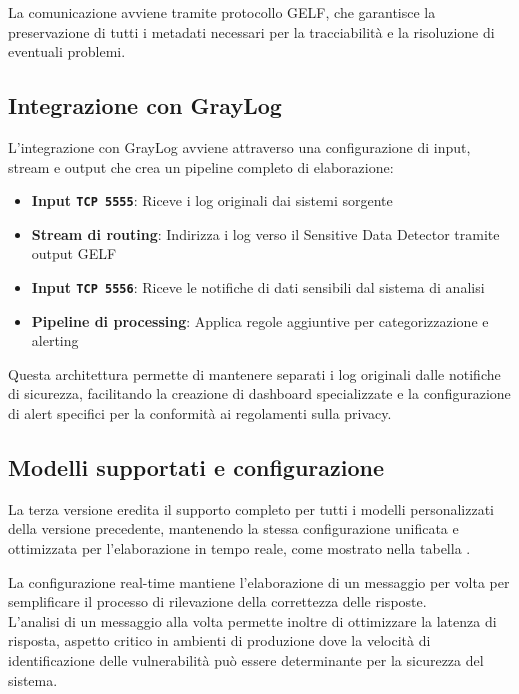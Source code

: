 \documentclass[12pt]{report}
\begin{document}
La comunicazione avviene tramite protocollo GELF, che garantisce la preservazione di tutti i metadati necessari per la tracciabilità e la risoluzione di eventuali problemi.


\subsection{Integrazione con GrayLog}
\label{subsec:ver3_integrazione}

L'integrazione con GrayLog avviene attraverso una configurazione di input, stream e output che crea un pipeline completo di elaborazione:

\begin{itemize}
    \item \textbf{Input \texttt{TCP 5555}}: Riceve i log originali dai sistemi sorgente
    \item \textbf{Stream di routing}: Indirizza i log verso il Sensitive Data Detector tramite output GELF
    \item \textbf{Input \texttt{TCP 5556}}: Riceve le notifiche di dati sensibili dal sistema di analisi
    \item \textbf{Pipeline di processing}: Applica regole aggiuntive per categorizzazione e alerting
\end{itemize}

Questa architettura permette di mantenere separati i log originali dalle notifiche di sicurezza, facilitando la creazione di dashboard specializzate e la configurazione di alert specifici per la conformità ai regolamenti sulla privacy.

\subsection{Modelli supportati e configurazione}
\label{subsec:ver3_modelli_supportati}

La terza versione eredita il supporto completo per tutti i modelli personalizzati della versione precedente, mantenendo la stessa configurazione unificata e ottimizzata per l'elaborazione in tempo reale, come mostrato nella tabella .

La configurazione real-time mantiene l'elaborazione di un messaggio per volta per semplificare il processo di rilevazione della correttezza delle risposte. \\
L'analisi di un messaggio alla volta permette inoltre di ottimizzare la latenza di risposta, aspetto critico in ambienti di produzione dove la velocità di identificazione delle vulnerabilità può essere determinante per la sicurezza del sistema.
\end{document}
